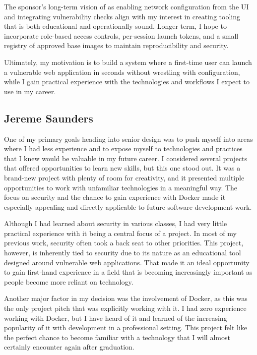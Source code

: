 \documentclass[12pt,titlepage]{article}
\begin{document}
The sponsor’s long-term vision of as enabling network configuration from the UI and integrating vulnerability checks align with my interest in creating tooling that is both educational and operationally sound. Longer term, I hope to incorporate role-based access controls, per-session launch tokens, and a small registry of approved base images to maintain reproducibility and security.

Ultimately, my motivation is to build a system where a first-time user can launch a vulnerable web application in seconds without wrestling with configuration, while I gain practical experience with the technologies and workflows I expect to use in my career.

\subsection{Jereme Saunders}
One of my primary goals heading into senior design was to push myself into areas where I had less experience and to expose myself to technologies and practices that I knew would be valuable in my future career. I considered several projects that offered opportunities to learn new skills, but this one stood out. It was a brand-new project with plenty of room for creativity, and it presented multiple opportunities to work with unfamiliar technologies in a meaningful way. The focus on security and the chance to gain experience with Docker made it especially appealing and directly applicable to future software development work.

Although I had learned about security in various classes, I had very little practical experience with it being a central focus of a project. In most of my previous work, security often took a back seat to other priorities. This project, however, is inherently tied to security due to its nature as an educational tool designed around vulnerable web applications. That made it an ideal opportunity to gain first-hand experience in a field that is becoming increasingly important as people become more reliant on technology.

Another major factor in my decision was the involvement of Docker, as this was the only project pitch that was explicitly working with it. I had zero experience working with Docker, but I have heard of it and learned of the increasing popularity of it with development in a professional setting. This project felt like the perfect chance to become familiar with a technology that I will almost certainly encounter again after graduation.
\end{document}
